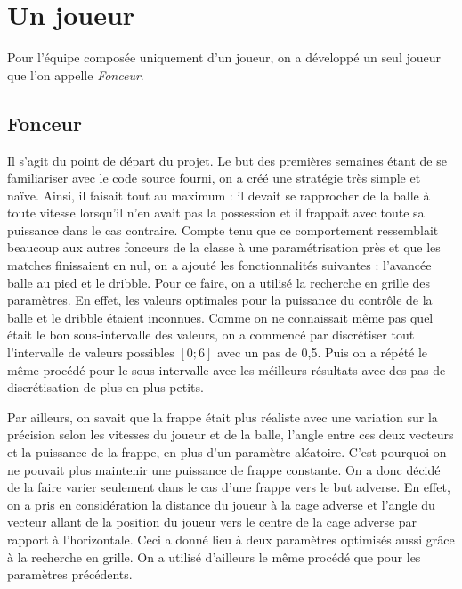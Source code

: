 \documentclass[12pt,a4paper]{article}
\begin{document}
\section{Un joueur}
Pour l'\'equipe compos\'ee uniquement d'un joueur, on a d\'evelopp\'e un seul 
joueur que l'on appelle {\itshape Fonceur}. 

\subsection*{Fonceur}
Il s'agit du point de d\'epart du projet. Le but des premi\`eres semaines 
\'etant de se familiariser avec le code source fourni, on a cr\'e\'e une 
strat\'egie tr\`es simple et na\"ive. 
Ainsi, il faisait tout au maximum : il devait se rapprocher de la balle \`a 
toute vitesse lorsqu'il n'en avait pas la possession et il 
frappait avec toute sa puissance dans le cas contraire.
Compte tenu que ce comportement ressemblait beaucoup aux autres fonceurs de la 
classe \`a une param\'etrisation pr\`es et que les matches finissaient en nul, 
on 
a ajout\'e les fonctionnalit\'es suivantes : l'avanc\'ee balle au pied et le 
dribble.
Pour ce faire, on a utilis\'e la recherche en grille des param\`etres. En 
effet, les valeurs optimales pour la puissance du contr\^ole de la balle et 
le dribble \'etaient inconnues.
Comme on ne connaissait m\^eme pas quel \'etait le bon sous-intervalle des 
valeurs, on a commenc\'e par discr\'etiser tout l'intervalle 
de valeurs possibles $\left[0;6\right]$ avec un pas de 0,5. Puis on a 
r\'ep\'et\'e le m\^eme proc\'ed\'e pour le sous-intervalle avec les m\'eilleurs 
r\'esultats avec des pas de discr\'etisation de plus en plus petits.

Par ailleurs, on savait que la frappe \'etait plus r\'ealiste avec une 
variation sur la pr\'ecision selon les vitesses du joueur et de la balle, 
l'angle entre ces deux vecteurs et la puissance de la frappe, en plus d'un 
param\`etre al\'eatoire. C'est pourquoi on ne pouvait plus maintenir 
une puissance de frappe constante. On a donc d\'ecid\'e de la faire varier 
seulement dans le cas d'une frappe vers le but adverse. En effet, on a pris en 
consid\'eration la distance du joueur \`a la cage adverse et l'angle du vecteur 
allant de la position du joueur vers le centre de la cage adverse 
par rapport \`a l'horizontale. Ceci a donn\'e lieu \`a deux param\`etres 
optimis\'es aussi gr\^ace \`a la recherche en grille. On a utilis\'e d'ailleurs 
le m\^eme proc\'ed\'e que pour les param\`etres pr\'ec\'edents.
\end{document}
